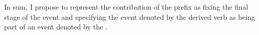 In sum, I propose to represent the contribution of the prefix  as fixing the final stage of the event and specifying the event denoted by the derived verb as being part of an event denoted by the .


%


